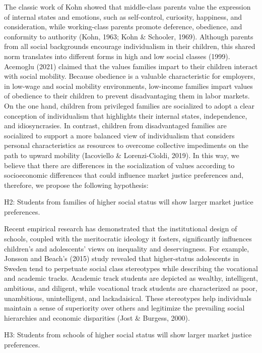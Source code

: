 \documentclass[
  letterpaper,
  DIV=11,
  numbers=noendperiod]{scrartcl}
\begin{document}
The classic work of Kohn showed that middle-class parents value the
expression of internal states and emotions, such as self-control,
curiosity, happiness, and consideration, while working-class parents
promote deference, obedience, and conformity to authority (Kohn, 1963;
Kohn \& Schooler, 1969). Although parents from all social backgrounds
encourage individualism in their children, this shared norm translates
into different forms in high and low social classes (1999). Acemoglu
(2021) claimed that the values families impart to their children
interact with social mobility. Because obedience is a valuable
characteristic for employers, in low-wage and social mobility
environments, low-income families impart values of obedience to their
children to prevent disadvantaging them in labor markets. On the one
hand, children from privileged families are socialized to adopt a clear
conception of individualism that highlights their internal states,
independence, and idiosyncrasies. In contrast, children from
disadvantaged families are socialized to support a more balanced view of
individualism that considers personal characteristics as resources to
overcome collective impediments on the path to upward mobility
(Iacoviello \& Lorenzi-Cioldi, 2019). In this way, we believe that there
are differences in the socialization of values according to
socioeconomic differences that could influence market justice
preferences and, therefore, we propose the following hypothesis:

H2: Students from families of higher social status will show larger
market justice preferences.

Recent empirical research has demonstrated that the institutional design
of schools, coupled with the meritocratic ideology it fosters,
significantly influences children's and adolescents' views on inequality
and deservingness. For example, Jonsson and Beach's (2015) study
revealed that higher-status adolescents in Sweden tend to perpetuate
social class stereotypes while describing the vocational and academic
tracks. Academic track students are depicted as wealthy, intelligent,
ambitious, and diligent, while vocational track students are
characterized as poor, unambitious, unintelligent, and lackadaisical.
These stereotypes help individuals maintain a sense of superiority over
others and legitimize the prevailing social hierarchies and economic
disparities (Jost \& Burgess, 2000).

H3: Students from schools of higher social status will show larger
market justice preferences.
\end{document}
